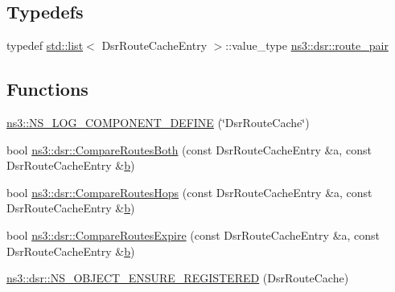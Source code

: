 \subsection*{Typedefs}
\begin{DoxyCompactItemize}
\item 
typedef \hyperlink{openflow-interface_8h_afd9bcfa176617760671b67580f536fa7}{std\+::list}$<$ Dsr\+Route\+Cache\+Entry $>$\+::value\+\_\+type \hyperlink{namespacens3_1_1dsr_aef011a0193cb8462ab3c02212b142dc9}{ns3\+::dsr\+::route\+\_\+pair}
\end{DoxyCompactItemize}
\subsection*{Functions}
\begin{DoxyCompactItemize}
\item 
\hyperlink{namespacens3_a56f97269c840193364bef7b7cd8333fe}{ns3\+::\+N\+S\+\_\+\+L\+O\+G\+\_\+\+C\+O\+M\+P\+O\+N\+E\+N\+T\+\_\+\+D\+E\+F\+I\+NE} (\char`\"{}Dsr\+Route\+Cache\char`\"{})
\item 
bool \hyperlink{namespacens3_1_1dsr_a37d4c01f63b6c1edb67cb5c5ce16ad25}{ns3\+::dsr\+::\+Compare\+Routes\+Both} (const Dsr\+Route\+Cache\+Entry \&a, const Dsr\+Route\+Cache\+Entry \&\hyperlink{lte__pathloss_8m_a21ad0bd836b90d08f4cf640b4c298e7c}{b})
\item 
bool \hyperlink{namespacens3_1_1dsr_a97e8ae60f143c7591cb09f96761ad1ea}{ns3\+::dsr\+::\+Compare\+Routes\+Hops} (const Dsr\+Route\+Cache\+Entry \&a, const Dsr\+Route\+Cache\+Entry \&\hyperlink{lte__pathloss_8m_a21ad0bd836b90d08f4cf640b4c298e7c}{b})
\item 
bool \hyperlink{namespacens3_1_1dsr_a53bce2b069de9151de0203d96468684e}{ns3\+::dsr\+::\+Compare\+Routes\+Expire} (const Dsr\+Route\+Cache\+Entry \&a, const Dsr\+Route\+Cache\+Entry \&\hyperlink{lte__pathloss_8m_a21ad0bd836b90d08f4cf640b4c298e7c}{b})
\item 
\hyperlink{namespacens3_1_1dsr_a4d6bbf0fd6db8429259756c3f655f04b}{ns3\+::dsr\+::\+N\+S\+\_\+\+O\+B\+J\+E\+C\+T\+\_\+\+E\+N\+S\+U\+R\+E\+\_\+\+R\+E\+G\+I\+S\+T\+E\+R\+ED} (Dsr\+Route\+Cache)
\end{DoxyCompactItemize}
